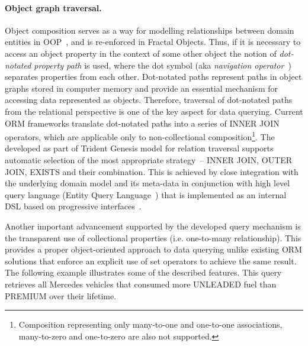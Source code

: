 \paragraph{Object graph traversal.}
  Object composition serves as a way for modelling relationships between domain entities in OOP~\cite{Martin2002}, and is re-enforced in Fractal Objects.
  Thus, if it is necessary to access an object property in the context of some other object the notion of \emph{dot-notated property path} is used, where the dot symbol (aka \emph{navigation operator}~\cite{DeMichiel:2012:JPA}) separates properties from each other.
  Dot-notated paths represent paths in object graphs stored in computer memory and provide an essential mechanism for accessing data represented as objects.
  Therefore, traversal of dot-notated paths from the relational perspective is one of the key aspect for data querying.
  Current ORM frameworks translate dot-notated paths into a series of INNER JOIN operators, which are applicable only to non-collectional composition\footnote{Composition representing only many-to-one and one-to-one associations, many-to-zero and one-to-zero are also not supported.}.
  The developed as part of Trident Genesis model for relation traversal supports automatic selection of the most appropriate strategy~-- INNER JOIN, OUTER JOIN, EXISTS and their combination.
  This is achieved by close integration with the underlying domain model and its meta-data in conjunction with high level query language (Entity Query Language~\cite{Hodych:2012}) that is implemented as an internal DSL based on progressive interfaces~\cite{Fowler:2010:DSL}.
  
  Another important advancement supported by the developed query mechanism is the transparent use of collectional properties (i.e. one-to-many relationship).
  This provides a proper object-oriented approach to data querying unlike existing ORM solutions that enforce an explicit use of set operators to achieve the same result.
  The following example illustrates some of the described features.  
  This query retrieves all Mercedes vehicles that consumed more UNLEADED fuel than PREMIUM over their lifetime.


